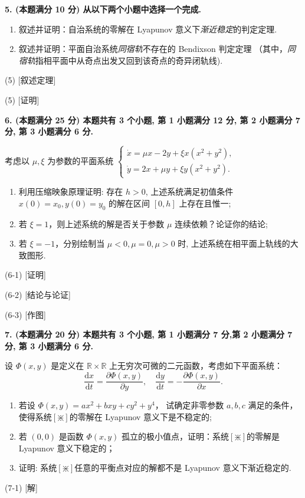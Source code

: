 \textbf{5. (本题满分 10 分) 从以下两个小题中选择一个完成.}
\begin{enumerate}[label=(\arabic*)]
\item 叙述并证明：自治系统的零解在 Lyapunov 意义下\textit{渐近稳定}的判定定理.
\item 叙述并证明：平面自治系统\textit{同宿轨}不存在的 Bendixson 判定定理
（其中，\textit{同宿轨}指相平面中从奇点出发又回到该奇点的奇异闭轨线).
\end{enumerate}
(5) [叙述定理]

(5) [证明]

\textbf{6. (本题满分 25 分) 本题共有 3 个小题, 第 1 小题满分 12 分, 第 2 小题满分 7 分, 第 3 小题满分 6 分.}

考虑以 $\mu, \xi$ 为参数的平面系统 
$\begin{cases}\dot{x}=\mu x-2 y+\xi x(x^{2}+y^{2}), \\ 
\dot{y}=2 x+\mu y+\xi y(x^{2}+y^{2}). \end{cases}$
\begin{enumerate}[label=(\arabic*)]
\item 利用压缩映象原理证明: 存在 $h>0$, 上述系统满足初值条件 $x(0)=x_{0}, y(0)=y_{0}$ 的解在区间 $[0, h]$ 上存在且惟一;
\item 若 $\xi=1$，则上述系统的解是否关于参数 $\mu$ 连续依赖？论证你的结论;
\item 若 $\xi=-1$，分别绘制当 $\mu<0, \mu=0, \mu>0$ 时, 上述系统在相平面上轨线的大致图形.
\end{enumerate}
(6-1) [证明]

(6-2) [结论与论证]

(6-3) [作图]

\textbf{7. (本题满分 20 分) 本题共有 3 个小题, 第 1 小题满分 7 分,第 2 小题满分 7 分, 第 3 小题满分 6 分.}

设 $\varPhi(x, y)$ 是定义在 $\mathbb{R} \times \mathbb{R}$ 上无穷次可微的二元函数，考虑如下平面系统：
\[
\frac{\mathrm{d} x}{\mathrm{d} t}=\frac{\partial \varPhi(x, y)}{\partial y}, \quad 
\frac{\mathrm{d} y}{\mathrm{d} t}=-\frac{\partial \varPhi(x, y)}{\partial x}. \tag{$\cdots\,\cdots[\divideontimes]$}
\]
\begin{enumerate}[label=(\arabic*)]
\item 若设 $\varPhi(x, y)=a x^{2}+b x y+c y^{2}+y^{4}$，
试确定非零参数 $a, b, c$ 满足的条件，使得系统$[\divideontimes]$的零解在 Lyapunov 意义下是不稳定的;
\item 若 $(0,0)$ 是函数 $\varPhi(x, y)$ 孤立的极小值点，证明：系统$[\divideontimes]$的零解是 Lyapunov 意义下稳定的；
\item 证明: 系统$[\divideontimes]$任意的平衡点对应的解都不是 Lyapunov 意义下渐近稳定的.
\end{enumerate}
(7-1) [解]

